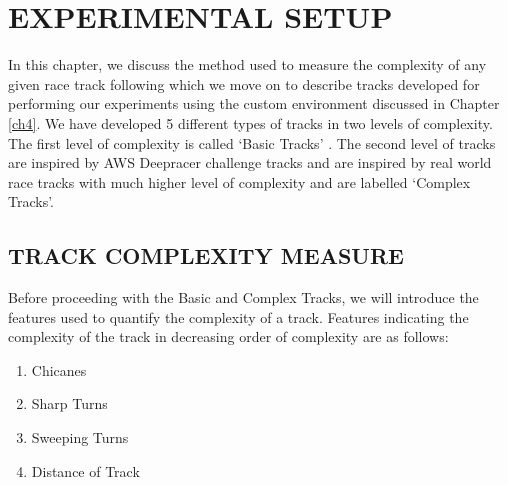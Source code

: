
\chapter{EXPERIMENTAL SETUP} \label{ch5}

In this chapter, we discuss the method used to measure the complexity
of any given race track following which we move on to describe tracks
developed for performing our experiments using the custom environment
discussed in Chapter \ref{ch4}. We have developed 5 different types of
tracks in two levels of complexity. The first level of complexity is
called `Basic Tracks' . The second level of tracks are inspired by AWS
Deepracer \cite{deepracer} challenge tracks and are inspired by real
world race tracks with much higher level of complexity and are
labelled `Complex Tracks'.


\section{TRACK COMPLEXITY MEASURE}

Before proceeding with the Basic and Complex Tracks, we will introduce
the features used to quantify the complexity of a track. Features
indicating the complexity of the track in decreasing order of
complexity are as follows:
\begin{enumerate}
\item Chicanes
\item Sharp Turns
\item Sweeping Turns
\item Distance of Track
\end{enumerate}

